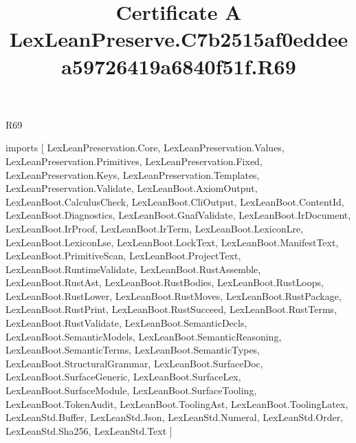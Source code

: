 \begin{lexlean}{R69}
\title{Certificate A LexLeanPreserve.C7b2515af0eddeea59726419a6840f51f.R69}
\begin{coremodule}
imports [
  LexLeanPreservation.Core,
  LexLeanPreservation.Values,
  LexLeanPreservation.Primitives,
  LexLeanPreservation.Fixed,
  LexLeanPreservation.Keys,
  LexLeanPreservation.Templates,
  LexLeanPreservation.Validate,
  LexLeanBoot.AxiomOutput,
  LexLeanBoot.CalculusCheck,
  LexLeanBoot.CliOutput,
  LexLeanBoot.ContentId,
  LexLeanBoot.Diagnostics,
  LexLeanBoot.GnafValidate,
  LexLeanBoot.IrDocument,
  LexLeanBoot.IrProof,
  LexLeanBoot.IrTerm,
  LexLeanBoot.LexiconLre,
  LexLeanBoot.LexiconLse,
  LexLeanBoot.LockText,
  LexLeanBoot.ManifestText,
  LexLeanBoot.PrimitiveScan,
  LexLeanBoot.ProjectText,
  LexLeanBoot.RuntimeValidate,
  LexLeanBoot.RustAssemble,
  LexLeanBoot.RustAst,
  LexLeanBoot.RustBodies,
  LexLeanBoot.RustLoops,
  LexLeanBoot.RustLower,
  LexLeanBoot.RustMoves,
  LexLeanBoot.RustPackage,
  LexLeanBoot.RustPrint,
  LexLeanBoot.RustSucceed,
  LexLeanBoot.RustTerms,
  LexLeanBoot.RustValidate,
  LexLeanBoot.SemanticDecls,
  LexLeanBoot.SemanticModels,
  LexLeanBoot.SemanticReasoning,
  LexLeanBoot.SemanticTerms,
  LexLeanBoot.SemanticTypes,
  LexLeanBoot.StructuralGrammar,
  LexLeanBoot.SurfaceDoc,
  LexLeanBoot.SurfaceGeneric,
  LexLeanBoot.SurfaceLex,
  LexLeanBoot.SurfaceModule,
  LexLeanBoot.SurfaceTooling,
  LexLeanBoot.TokenAudit,
  LexLeanBoot.ToolingAst,
  LexLeanBoot.ToolingLatex,
  LexLeanStd.Buffer,
  LexLeanStd.Json,
  LexLeanStd.Numeral,
  LexLeanStd.Order,
  LexLeanStd.Sha256,
  LexLeanStd.Text
]


\end{coremodule}
\end{lexlean}
